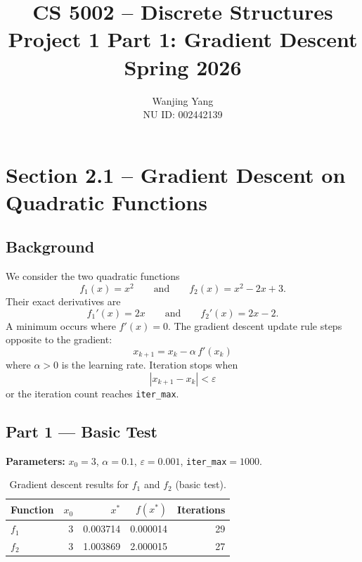 \documentclass[11pt, letterpaper]{article}
\title{%
  \textbf{CS 5002 – Discrete Structures}\\[4pt]
  \large Project 1 Part 1: Gradient Descent\\[2pt]
  \normalsize Spring 2026
}
\author{ Wanjing Yang \\ NU ID: 002442139}
\date{}
\begin{document}
\maketitle
\thispagestyle{fancy}

\tableofcontents
\newpage

\section{Section 2.1 – Gradient Descent on Quadratic Functions}
\subsection{Background}

We consider the two quadratic functions
\begin{equation}
  f_1(x)=x^2 \qquad \text{and} \qquad f_2(x)=x^2-2x+3.
\end{equation}
Their exact derivatives are
\begin{equation}
  f_1'(x)=2x \qquad \text{and} \qquad f_2'(x)=2x-2.
\end{equation}
A minimum occurs where $f'(x)=0$.  The gradient descent update rule steps
opposite to the gradient:
\begin{equation}
  \boxed{x_{k+1} = x_k - \alpha\,f'(x_k)}
\end{equation}
where $\alpha>0$ is the learning rate.  Iteration stops when
\begin{equation}
  |x_{k+1}-x_k| < \varepsilon
\end{equation}
or the iteration count reaches \texttt{iter\_max}.

\subsection{Part 1 — Basic Test}

\textbf{Parameters:} $x_0=3$, $\alpha=0.1$, $\varepsilon=0.001$,
\texttt{iter\_max}$=1000$.

\begin{table}[H]
\centering
\caption{Gradient descent results for $f_1$ and $f_2$ (basic test).}
\begin{tabular}{lrrrr}
\toprule
Function & $x_0$ & $x^*$ & $f(x^*)$ & Iterations \\
\midrule
$f_1$ & 3 & 0.003714 & 0.000014 & 29 \\
$f_2$ & 3 & 1.003869 & 2.000015 & 27 \\
\bottomrule
\end{tabular}
\end{table}
\end{document}
